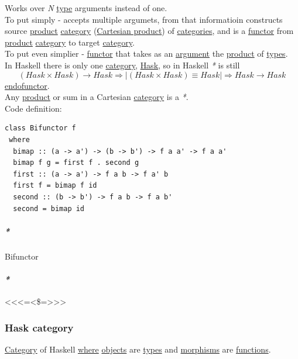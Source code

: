 \documentclass[11pt]{article}
\begin{document}
Works over \emph{N} \hyperref[org4fbaeb8]{type} arguments instead of one.\\

To put simply - accepts multiple argumets, from that informatioin constructs source \hyperref[orga3d1454]{product} \hyperref[org3e3a79b]{category} (\hyperref[org434cb99]{Cartesian product}) of \hyperref[org43ea200]{categories}, and is a \hyperref[org6073683]{functor} from \hyperref[orga3d1454]{product} \hyperref[org3e3a79b]{category} to target \hyperref[org3e3a79b]{category}.\\

To put even simplier - \hyperref[org6073683]{functor} that takes as an \hyperref[orgf66a5f7]{argument} the \hyperref[orga3d1454]{product} of \hyperref[org3927fd9]{types}.\\

In Haskell there is only one \hyperref[org3e3a79b]{category}, \hyperref[org79be162]{Hask}, so in Haskell \emph{*} is still $$ (Hask \times Hask) \rightarrow Hask \Rightarrow | (Hask \times Hask) \equiv Hask | \Rightarrow Hask \rightarrow Hask $$ \hyperref[org4dce7a1]{endofunctor}.\\

Any \hyperref[orga3d1454]{product} or sum in a Cartesian \hyperref[org3e3a79b]{category} is a \emph{*}.\\

Code definition:\\
\begin{verbatim}
class Bifunctor f
 where
  bimap :: (a -> a') -> (b -> b') -> f a a' -> f a a'
  bimap f g = first f . second g
  first :: (a -> a') -> f a b -> f a' b
  first f = bimap f id
  second :: (b -> b') -> f a b -> f a b'
  second = bimap id
\end{verbatim}

\subparagraph{\emph{*}}
\label{sec:org7404999}
\label{org459acb0}Bifunctor\\

\paragraph{\emph{*}}
\label{sec:orga106b40}

<<<=<\$=>>>\\

\subsubsection{\label{org5c23177}Hask category}
\label{sec:org57d9b9f}
\hyperref[org3e3a79b]{Category} of Haskell \hyperref[orgefd1ecd]{where} \hyperref[orge0f000f]{objects} are \hyperref[org3927fd9]{types} and \hyperref[org8ed0ce8]{morphisms} are \hyperref[org66c5288]{functions}.\\
\end{document}
